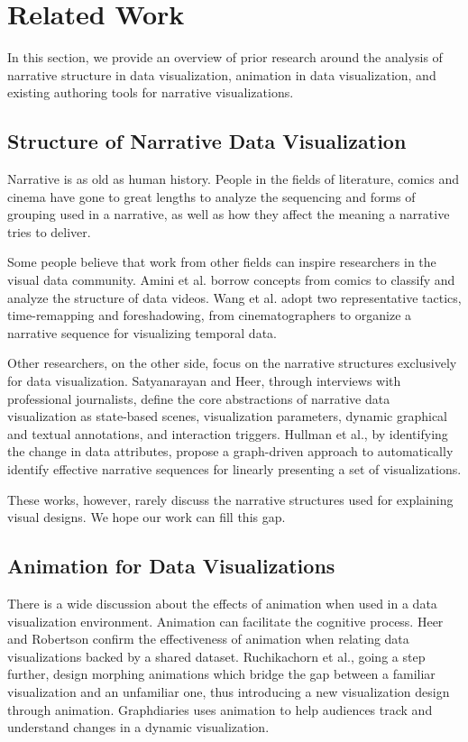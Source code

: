 \section {Related Work}
In this section, we provide an overview of prior research around the analysis of narrative structure in data visualization, animation in data visualization, and existing authoring tools for narrative visualizations.

\subsection{Structure of Narrative Data Visualization}
Narrative is as old as human history\cite{cunningham_culture_2009}.  People in the fields of literature, comics \cite{cohn_visual_2013} and cinema \cite{schmidt_living_2017} have gone to great lengths to analyze the sequencing and forms of grouping used in a narrative, as well as how they affect the meaning a narrative tries to deliver. 

Some people believe that work from other fields can inspire researchers in the visual data community. Amini et al.\cite{amini_understanding_2015} borrow concepts from comics \cite{cohn_visual_2013} to classify and analyze the structure of data videos. Wang et al. \cite{wang_animated_2016} adopt two representative tactics, time-remapping and foreshadowing, from cinematographers to organize a narrative sequence for visualizing temporal data. 

Other researchers, on the other side, focus on the narrative structures exclusively for data visualization. 
Satyanarayan and Heer, through interviews with professional journalists\cite{satyanarayan_authoring_2014}, define the core abstractions of narrative data visualization as state-based scenes, visualization parameters, dynamic graphical and textual annotations, and interaction triggers. Hullman et al.\cite{hullman_deeper_2013}, by identifying the change in data attributes, propose a graph-driven approach to automatically identify effective narrative sequences for linearly presenting a set of visualizations. 

These works, however, rarely discuss the narrative structures used for explaining visual designs. We hope our work can fill this gap.
\subsection{Animation for Data Visualizations}
There is a wide discussion about the effects of animation when used in a data visualization environment.
Animation can facilitate the cognitive process. Heer and Robertson \cite{heer_animated_2007-1} confirm the effectiveness of animation when relating data visualizations backed by a shared dataset. Ruchikachorn et al.\cite{ruchikachorn_learning_2015}, going a step further, design morphing animations which bridge the gap between a familiar visualization and an unfamiliar one, thus introducing a new visualization design through animation. Graphdiaries \cite{bach_graphdiaries:_2014} uses animation to help audiences track and understand changes in a dynamic visualization. 

